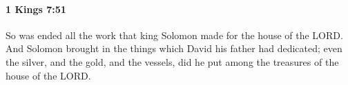 
		\paragraph{1 Kings 7:51} %
			\label{1KINGS-7-51}

			So was ended all the work that king Solomon made for the house of the LORD. And Solomon brought in the things which David his father had dedicated; even the silver, and the gold, and the vessels, did he put among the treasures of the house of the LORD.

